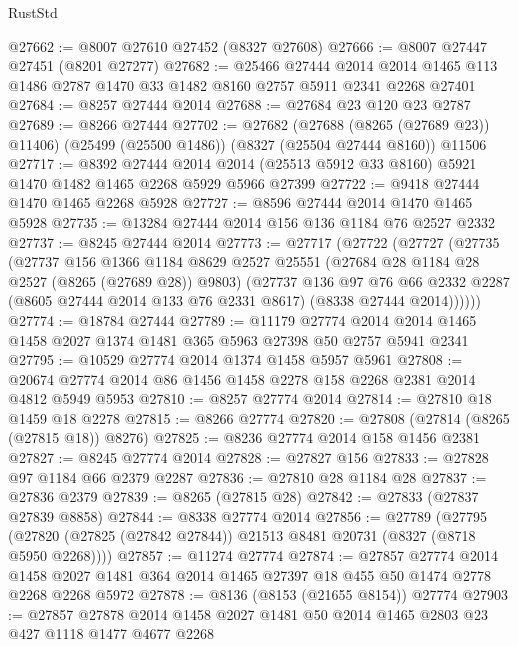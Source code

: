 \begin{lexlean}{RustStd}
\begin{coremodule}
@27662 := @8007 @27610 @27452 (@8327 @27608)
@27666 := @8007 @27447 @27451 (@8201 @27277)
@27682 := @25466
    @27444
    @2014
    @2014
    @1465
    @113
    @1486
    @2787
    @1470
    @33
    @1482
    @8160
    @2757
    @5911
    @2341
    @2268
    @27401
@27684 := @8257 @27444 @2014
@27688 := @27684 @23 @120 @23 @2787
@27689 := @8266 @27444
@27702 := @27682
    (@27688 (@8265 (@27689 @23)) @11406)
    (@25499 (@25500 @1486))
    (@8327 (@25504 @27444 @8160))
    @11506
@27717 := @8392
    @27444
    @2014
    @2014
    (@25513 @5912 @33 @8160)
    @5921
    @1470
    @1482
    @1465
    @2268
    @5929
    @5966
    @27399
@27722 := @9418 @27444 @1470 @1465 @2268 @5928
@27727 := @8596 @27444 @2014 @1470 @1465 @5928
@27735 := @13284 @27444 @2014 @156 @136 @1184 @76 @2527 @2332
@27737 := @8245 @27444 @2014
@27773 := @27717
    (@27722
      (@27727
        (@27735
          (@27737
            @156
            @1366
            @1184
            @8629
            @2527
            @25551
            (@27684 @28 @1184 @28 @2527 (@8265 (@27689 @28)) @9803)
            (@27737
              @136
              @97
              @76
              @66
              @2332
              @2287
              (@8605 @27444 @2014 @133 @76 @2331 @8617)
              (@8338 @27444 @2014))))))
@27774 := @18784 @27444
@27789 := @11179
    @27774
    @2014
    @2014
    @1465
    @1458
    @2027
    @1374
    @1481
    @365
    @5963
    @27398
    @50
    @2757
    @5941
    @2341
@27795 := @10529 @27774 @2014 @1374 @1458 @5957 @5961
@27808 := @20674 @27774 @2014 @86 @1456 @1458 @2278 @158 @2268 @2381 @2014 @4812 @5949 @5953
@27810 := @8257 @27774 @2014
@27814 := @27810 @18 @1459 @18 @2278
@27815 := @8266 @27774
@27820 := @27808 (@27814 (@8265 (@27815 @18)) @8276)
@27825 := @8236 @27774 @2014 @158 @1456 @2381
@27827 := @8245 @27774 @2014
@27828 := @27827 @156
@27833 := @27828 @97 @1184 @66 @2379 @2287
@27836 := @27810 @28 @1184 @28
@27837 := @27836 @2379
@27839 := @8265 (@27815 @28)
@27842 := @27833 (@27837 @27839 @8858)
@27844 := @8338 @27774 @2014
@27856 := @27789
    (@27795 (@27820 (@27825 (@27842 @27844)) @21513 @8481 @20731 (@8327 (@8718 @5950 @2268))))
@27857 := @11274 @27774
@27874 := @27857
    @27774
    @2014
    @1458
    @2027
    @1481
    @364
    @2014
    @1465
    @27397
    @18
    @455
    @50
    @1474
    @2778
    @2268
    @2268
    @5972
@27878 := @8136 (@8153 (@21655 @8154)) @27774
@27903 := @27857
    @27878
    @2014
    @1458
    @2027
    @1481
    @50
    @2014
    @1465
    @2803
    @23
    @427
    @1118
    @1477
    @4677
    @2268

\end{coremodule}
\end{lexlean}
